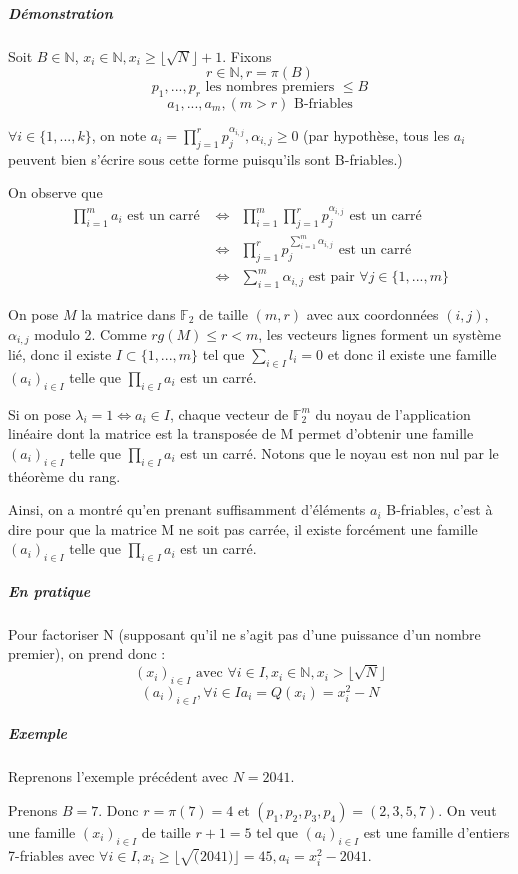 \documentclass[11pt,a4paper]{article}
\begin{document}
	\subparagraph{Démonstration}
	Soit $B \in \mathbb{N}$, $x_i \in \mathbb{N}, x_i \ge \lfloor \sqrt{N} \rfloor +1$. Fixons 
	$$r \in \mathbb{N}, r = \pi(B)$$
	$$p_1, ..., p_r \text{ les nombres premiers } \le B$$
	$$a_1, ..., a_m , (m>r) \text{ B-friables}$$
	
	$\forall i \in \{1, ..., k\}$, on note $a_i = \prod_{j=1}^r p_j^{\alpha_{i,j}}, \alpha_{i,j} \ge 0$ (par hypothèse, tous les $a_i$ peuvent bien s'écrire sous cette forme puisqu'ils sont B-friables.)
	
	On observe que 
	\begin{eqnarray*}
		\prod_{i=1}^m a_i \text{ est un carré }  &\iff& \prod_{i=1}^m \prod_{j=1}^r p_j^{\alpha_{i,j}} \text{ est un carré} \\
		&\iff& \prod_{j=1}^r p_j^{\sum_{i=1}^m \alpha_{i,j}} \text{ est un carré } \\
		&\iff& \sum_{i=1}^m \alpha_{i,j} \text{ est pair } \forall j \in \{1, ..., m\}
	\end{eqnarray*}
	
	On pose $M$ la matrice dans $\mathbb{F}_2$ de taille $(m,r)$ avec aux coordonnées $(i,j)$,  $\alpha_{i,j}$ modulo 2. 
	Comme $rg(M) \le r < m$, les vecteurs lignes forment un système lié, donc il existe $I \subset \{1, ..., m\}$ tel que $\sum_{i \in I} l_i = 0$ et donc il existe une famille $(a_i)_{i \in I}$ telle que $\prod_{i \in I} a_i$ est un carré. 
	
	Si on pose $\lambda_i = 1 \iff a_i \in I$, chaque vecteur de $\mathbb{F}_2^{m}$  du noyau de l'application linéaire dont la matrice est la transposée de M permet d'obtenir une famille $(a_i)_{i \in I}$ telle que $\prod_{i \in I} a_i$ est un carré. Notons que le noyau est non nul par le théorème du rang.
	
	
	Ainsi, on a montré qu'en prenant suffisamment d'éléments $a_i$ B-friables, c'est à dire pour que la matrice M ne soit pas carrée, il existe forcément une famille $(a_i)_{i \in I}$ telle que $\prod_{i \in I} a_i$ est un carré.
	
	
	\subparagraph{En pratique}
	Pour factoriser N (supposant qu'il ne s'agit pas d'une puissance d'un nombre premier), on prend donc : 
	$$(x_i)_{i \in I} \text{ avec } \forall i \in I, x_i \in \mathbb{N}, x_i > \lfloor \sqrt{N} \rfloor$$
	$$ (a_i)_{i \in I}, \forall i \in I a_i = Q(x_i) = x_i^2 - N$$
	
	\subparagraph{Exemple}
	Reprenons l'exemple précédent avec $N = 2041$.
	
	Prenons $B = 7$. Donc $r = \pi(7) = 4$ et $(p_1, p_2, p_3, p_4) = (2, 3, 5, 7)$.
	On veut une famille $(x_i)_{i \in I}$ de taille $r+1 = 5$ tel que $(a_i)_{i \in I}$ est une famille d'entiers 7-friables avec $\forall i \in I, x_i \ge \lfloor \sqrt(2041) \rfloor = 45, a_i = x_i^2 - 2041$. 
	
\end{document}
